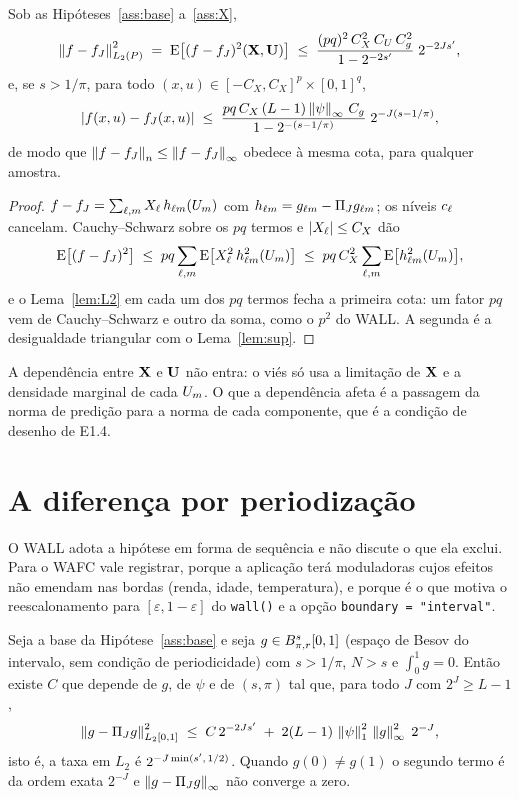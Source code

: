 \documentclass[11pt,a4paper]{article}
\begin{document}
\begin{corollary}\label{cor:vies}
Sob as Hipóteses~\ref{ass:base} a~\ref{ass:X},
\[
  \left\lVert f - f_{J} \right\rVert_{L_{2}(P)}^{2}
  \;=\; \mathrm{E}\bigl[(f - f_{J})^{2}(\mathbf{X},\mathbf{U})\bigr]
  \;\le\; \frac{(pq)^{2}\,C_{X}^{2}\,C_{U}\,C_{g}^{2}}{1 - 2^{-2s'}}\;
  2^{-2Js'},
\]
e, se $s > 1/\pi$, para todo $(x,u) \in [-C_{X},C_{X}]^{p}\times[0,1]^{q}$,
\[
  |f(x,u) - f_{J}(x,u)| \;\le\;
  \frac{pq\,C_{X}\,(L-1)\left\lVert \psi \right\rVert_{\infty}\,C_{g}}{1 - 2^{-(s-1/\pi)}}\;
  2^{-J(s - 1/\pi)} ,
\]
de modo que $\left\lVert f - f_{J} \right\rVert_{n} \le \left\lVert f - f_{J} \right\rVert_{\infty}$ obedece à
mesma cota, para qualquer amostra.
\end{corollary}

\begin{proof}
$f - f_{J} = \sum_{\ell,m} X_{\ell}\,h_{\ell m}(U_{m})$ com $h_{\ell m} =
g_{\ell m} - \Pi_{J}g_{\ell m}$; os níveis $c_{\ell}$ cancelam.
Cauchy--Schwarz sobre os $pq$ termos e $|X_{\ell}| \le C_{X}$ dão
\[
  \mathrm{E}\bigl[(f - f_{J})^{2}\bigr]
  \;\le\; pq\sum_{\ell,m}\mathrm{E}\bigl[X_{\ell}^{2}\,h_{\ell m}^{2}(U_{m})\bigr]
  \;\le\; pq\,C_{X}^{2}\sum_{\ell,m}\mathrm{E}\bigl[h_{\ell m}^{2}(U_{m})\bigr],
\]
e o Lema~\ref{lem:L2} em cada um dos $pq$ termos fecha a primeira cota: um
fator $pq$ vem de Cauchy--Schwarz e outro da soma, como o $p^{2}$ do WALL. A
segunda é a desigualdade triangular com o Lema~\ref{lem:sup}.
\end{proof}

A dependência entre $\mathbf{X}$ e $\mathbf{U}$ não entra: o viés só usa a limitação de
$\mathbf{X}$ e a densidade marginal de cada $U_{m}$. O que a dependência afeta é
a passagem da norma de predição para a norma de cada componente, que é a
condição de desenho de E1.4.

\section{A diferença por periodização}

O WALL adota a hipótese em forma de sequência e não discute o que ela exclui.
Para o WAFC vale registrar, porque a aplicação terá moduladoras cujos efeitos
não emendam nas bordas (renda, idade, temperatura), e porque é o que motiva
o reescalonamento para $[\varepsilon, 1-\varepsilon]$ do \texttt{wall()} e a
opção \texttt{boundary = "interval"}.

\begin{proposition}\label{prop:periodizacao}
Seja a base da Hipótese~\ref{ass:base} e seja $g \in B^{s}_{\pi,r}[0,1]$
(espaço de Besov do intervalo, sem condição de periodicidade) com
$s > 1/\pi$, $N > s$ e $\int_{0}^{1} g = 0$. Então existe $C$ que depende de
$g$, de $\psi$ e de $(s,\pi)$ tal que, para todo $J$ com $2^{J} \ge L - 1$,
\[
  \left\lVert g - \Pi_{J} g \right\rVert_{L_{2}[0,1]}^{2}
  \;\le\; C\,2^{-2Js'} \;+\; 2(L-1)\,\left\lVert \psi \right\rVert_{1}^{2}\,\left\lVert g \right\rVert_{\infty}^{2}\; 2^{-J},
\]
isto é, a taxa em $L_{2}$ é $2^{-J\min(s',\,1/2)}$. Quando $g(0) \ne g(1)$
o segundo termo é da ordem exata $2^{-J}$ e $\left\lVert g - \Pi_{J} g \right\rVert_{\infty}$
não converge a zero.
\end{proposition}
\end{document}
